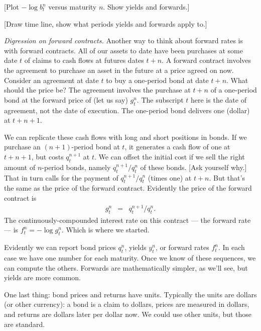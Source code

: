 \documentclass[11pt]{article}
\begin{document}
[Plot $-\log b^n_t$ versus maturity $n$.  Show yields and forwards.]

[Draw time line, show what periods yields and forwards apply to.]


{\it Digression on forward contracts.\/}
Another way to think about forward rates is with forward contracts.
All of our assets to date have been purchases at some date $t$
of claims to cash flows at futures dates $t+n$.
A forward contract involves the agreement to purchase an asset in the future
at a price agreed on now.
Consider an agreement at date $t$  to buy a one-period bond at date $t+n$.
What should the price be?
The agreement involves the purchase at $t+n$ of a one-period bond at the forward price of (let us say) $g^n_t$.
The subscript $t$ here is the date of agreement, not the date of execution.
The one-period bond delivers one (dollar) at $t+n+1$.

We can replicate these cash flows with long and short positions in bonds.
If we purchase an $(n+1)$-period bond at $t$, it generates a cash flow of one at $t+n+1$,
but costs $q^{n+1}_t$ at $t$.
We can offset the initial cost if we sell the right amount of $n$-period bonds,
namely $ q^{n+1}_t/q^n_t$ of these bonds.  [Ask yourself why.]
That in turn calls for the payment of $ q^{n+1}_t/q^n_t$ (times one) at $t+n$.
But that's the same as the price of the forward contract.
Evidently the price of the forward contract is
\begin{eqnarray*}
    g^n_t &=&  q^{n+1}_t/q^n_t .
\end{eqnarray*}
The continuously-compounded interest rate on this contract --- the forward rate ---
is $ f^n_t = - \log g^n_t$.
Which is where we started.


Evidently we can report bond prices $q^n_t$,
yields $y^n_t$, or forward rates $f^n_t$.
In each case we have one number for each maturity.
Once we know of these sequences, we can compute the others.
Forwards are mathematically simpler, as we'll see, but yields are more common.

One last thing:  bond prices and returns have units.
Typically the units are dollars (or other currency):
a bond is a claim to dollars, prices are measured in dollars,
and returns are dollars later per dollar now.
We could use other units, but those are standard.


\begin{comment}
\section{What would we like to explain?}

********************************

Report facts we'd like to account for....  ???
\end{comment} 
\end{document}
